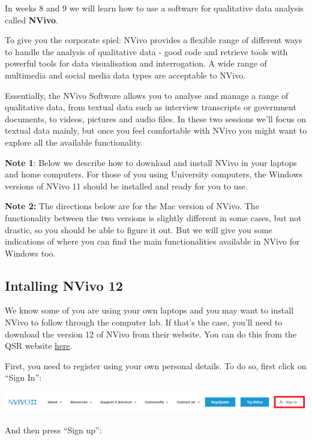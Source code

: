\documentclass[
]{book}
\begin{document}
In weeks 8 and 9 we will learn how to use a software for qualitative data analysis called \textbf{NVivo}.

To give you the corporate spiel: NVivo provides a flexible range of different ways to handle the analysis of qualitative data - good code and retrieve tools with powerful tools for data visualisation and interrogation. A wide range of multimedia and social media data types are acceptable to NVivo.

Essentially, the NVivo Software allows you to analyse and manage a range of qualitative data, from textual data such as interview transcripts or government documents, to videos, pictures and audio files. In these two sessions we'll focus on textual data mainly, but once you feel comfortable with NVivo you might want to explore all the available functionality.

\textbf{Note 1}: Below we describe how to download and install NVivo in your laptops and home computers. For those of you using University computers, the Windows versions of NVivo 11 should be installed and ready for you to use.

\textbf{Note 2:} The directions below are for the Mac version of NVivo. The functionality between the two versions is slightly different in some cases, but not drastic, so you should be able to figure it out. But we will give you some indications of where you can find the main functionalities available in NVivo for Windows too.

\hypertarget{intalling-nvivo-12}{%
\subsection{Intalling NVivo 12}\label{intalling-nvivo-12}}

We know some of you are using your own laptops and you may want to install NVivo to follow through the computer lab. If that's the case, you'll need to download the version 12 of NVivo from their website. You can do this from the QSR website \href{https://www.qsrinternational.com/nvivo-qualitative-data-analysis-software/home}{here}.

First, you need to register using your own personal details. To do so, first click on ``Sign In'':

\includegraphics{imgs/nvivo_signin.png}

And then press ``Sign up'':
\end{document}
